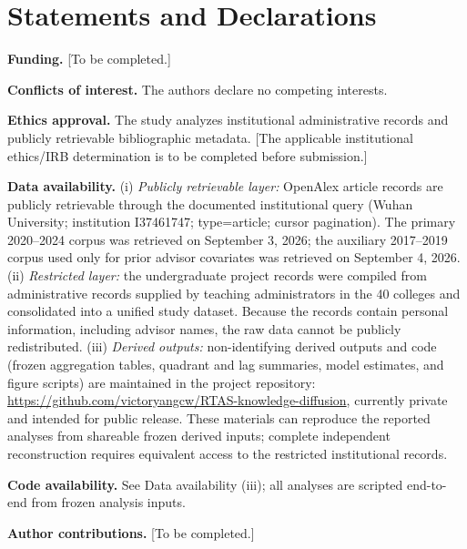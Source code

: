 \documentclass[11pt]{article}
\begin{document}
\section*{Statements and Declarations}

\textbf{Funding.} [To be completed.]

\textbf{Conflicts of interest.} The authors declare no competing interests.

\textbf{Ethics approval.} The study analyzes institutional administrative records and publicly retrievable bibliographic metadata. [The applicable institutional ethics/IRB determination is to be completed before submission.]

\textbf{Data availability.} (i) \emph{Publicly retrievable layer:} OpenAlex article records are publicly retrievable through the documented institutional query (Wuhan University; institution I37461747; type=article; cursor pagination). The primary 2020--2024 corpus was retrieved on September 3, 2026; the auxiliary 2017--2019 corpus used only for prior advisor covariates was retrieved on September 4, 2026. (ii) \emph{Restricted layer:} the undergraduate project records were compiled from administrative records supplied by teaching administrators in the 40 colleges and consolidated into a unified study dataset. Because the records contain personal information, including advisor names, the raw data cannot be publicly redistributed. (iii) \emph{Derived outputs:} non-identifying derived outputs and code (frozen aggregation tables, quadrant and lag summaries, model estimates, and figure scripts) are maintained in the project repository:
\url{https://github.com/victoryangcw/RTAS-knowledge-diffusion}, currently private and intended for public release. These materials can reproduce the reported analyses from shareable frozen derived inputs; complete independent reconstruction requires equivalent access to the restricted institutional records.

\textbf{Code availability.} See Data availability (iii); all analyses are scripted end-to-end from frozen analysis inputs.

\textbf{Author contributions.} [To be completed.]

\printbibliography



\clearpage

\renewcommand{\thepage}{S\arabic{page}}
\setcounter{page}{1}
\end{document}
